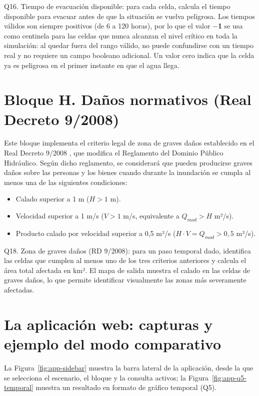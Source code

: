 Q16. Tiempo de evacuación disponible: para cada celda, calcula el tiempo disponible para evacuar antes de que la situación se vuelva peligrosa. Los tiempos válidos son siempre positivos (de 6 a 120 horas), por lo que el valor \textbf{$-$1} se usa como centinela para las celdas que nunca alcanzan el nivel crítico en toda la simulación: al quedar fuera del rango válido, no puede confundirse con un tiempo real y no requiere un campo booleano adicional. Un valor cero indica que la celda ya es peligrosa en el primer instante en que el agua llega.

\section{Bloque H. Daños normativos (Real Decreto 9/2008)}\label{bloque-h.-danos-normativos}

Este bloque implementa el criterio legal de zona de graves daños establecido en el Real Decreto 9/2008 \cite{rd9_2008}, que modifica el Reglamento del Dominio Público Hidráulico. Según dicho reglamento, se considerará que pueden producirse graves daños sobre las personas y los bienes cuando durante la inundación se cumpla al menos una de las siguientes condiciones:

\begin{itemize}
\item Calado superior a 1 m ($H > 1$ m).
\item Velocidad superior a 1 m/s ($V > 1$ m/s, equivalente a $Q_{mod} > H$ m²/s).
\item Producto calado por velocidad superior a 0,5 m²/s ($H \cdot V = Q_{mod} > 0{,}5$ m²/s).
\end{itemize}

Q18. Zona de graves daños (RD 9/2008): para un paso temporal dado, identifica las celdas que cumplen al menos uno de los tres criterios anteriores y calcula el área total afectada en km². El mapa de salida muestra el calado en las celdas de graves daños, lo que permite identificar visualmente las zonas más severamente afectadas.

\section{La aplicación web: capturas y ejemplo del modo comparativo}\label{anexo-a-modo-comparativo}

La Figura~\ref{fig:app-sidebar} muestra la barra lateral de la aplicación, desde la que se selecciona el escenario, el bloque y la consulta activos; la Figura~\ref{fig:app-q5-temporal} muestra un resultado en formato de gráfico temporal (Q5).

